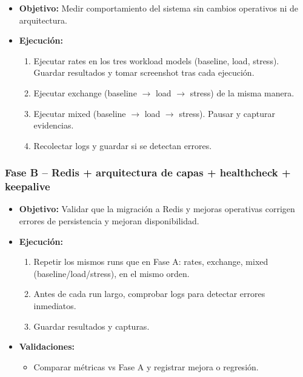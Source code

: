 \begin{itemize}[leftmargin=*]
    \item \textbf{Objetivo:} Medir comportamiento del sistema sin cambios operativos ni de arquitectura.

    \item \textbf{Ejecución:}
    \begin{enumerate}[leftmargin=2em]
        \item Ejecutar rates en los tres workload models (baseline, load, stress). Guardar resultados y tomar screenshot tras cada ejecución.
        \item Ejecutar exchange (baseline $\rightarrow$ load $\rightarrow$ stress) de la misma manera.
        \item Ejecutar mixed (baseline $\rightarrow$ load $\rightarrow$ stress). Pausar y capturar evidencias.
        \item Recolectar logs y guardar si se detectan errores.
    \end{enumerate}
\end{itemize}

\subsubsection{Fase B -- Redis + arquitectura de capas + healthcheck + keepalive}

\begin{itemize}[leftmargin=*]
    \item \textbf{Objetivo:} Validar que la migración a Redis y mejoras operativas corrigen errores de persistencia y mejoran disponibilidad.

    \item \textbf{Ejecución:}
    \begin{enumerate}[leftmargin=2em]
        \item Repetir los mismos runs que en Fase A: rates, exchange, mixed (baseline/load/stress), en el mismo orden.
        \item Antes de cada run largo, comprobar logs para detectar errores inmediatos.
        \item Guardar resultados y capturas.
    \end{enumerate}

    \item \textbf{Validaciones:}
    \begin{itemize}[leftmargin=2em]
        \item Comparar métricas vs Fase A y registrar mejora o regresión.
    \end{itemize}
\end{itemize}


